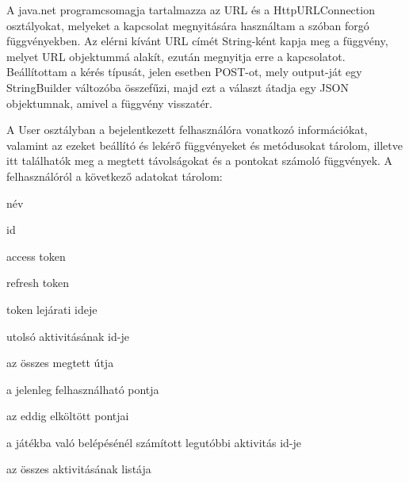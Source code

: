  

A java.net programcsomagja tartalmazza az URL és a HttpURLConnection osztályokat, melyeket a kapcsolat megnyitására használtam a szóban forgó függvényekben. Az elérni kívánt URL címét String-ként kapja meg a függvény, melyet URL objektummá alakít, ezután megnyitja erre a kapcsolatot. Beállítottam a kérés típusát, jelen esetben POST-ot, mely output-ját egy StringBuilder változóba összefűzi, majd ezt a választ átadja egy JSON objektumnak, amivel a függvény visszatér. 

A User osztályban a bejelentkezett felhasználóra vonatkozó információkat, valamint az ezeket beállító és lekérő függvényeket és metódusokat tárolom, illetve itt találhatók meg a megtett távolságokat és a pontokat számoló függvények. A felhasználóról a következő adatokat tárolom: 

név 

id 

access token 

refresh token 

token lejárati ideje 

utolsó aktivitásának id-je 

az összes megtett útja 

a jelenleg felhasználható pontja 

az eddig elköltött pontjai 

a játékba való belépésénél számított legutóbbi aktivitás id-je 

az összes aktivitásának listája 